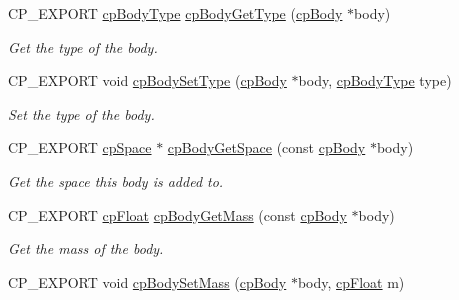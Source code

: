 \begin{DoxyCompactItemize}
C\+P\+\_\+\+E\+X\+P\+O\+RT \mbox{\hyperlink{group__cp_body_ga3581b128fd3e2734952aeac8545fd5ca}{cp\+Body\+Type}} \mbox{\hyperlink{group__cp_body_gab29fcc05a72380a8ae4cb09af6def230}{cp\+Body\+Get\+Type}} (\mbox{\hyperlink{structcp_body}{cp\+Body}} $\ast$body)
\begin{DoxyCompactList}\small\item\em Get the type of the body. \end{DoxyCompactList}\item 
\mbox{\label{group__cp_body_ga0ad914398f84d9096a7292f5e55e5771}} 
C\+P\+\_\+\+E\+X\+P\+O\+RT void \mbox{\hyperlink{group__cp_body_ga0ad914398f84d9096a7292f5e55e5771}{cp\+Body\+Set\+Type}} (\mbox{\hyperlink{structcp_body}{cp\+Body}} $\ast$body, \mbox{\hyperlink{group__cp_body_ga3581b128fd3e2734952aeac8545fd5ca}{cp\+Body\+Type}} type)
\begin{DoxyCompactList}\small\item\em Set the type of the body. \end{DoxyCompactList}\item 
\mbox{\label{group__cp_body_ga89651e80a253e8b53155bc9f13fa5718}} 
C\+P\+\_\+\+E\+X\+P\+O\+RT \mbox{\hyperlink{structcp_space}{cp\+Space}} $\ast$ \mbox{\hyperlink{group__cp_body_ga89651e80a253e8b53155bc9f13fa5718}{cp\+Body\+Get\+Space}} (const \mbox{\hyperlink{structcp_body}{cp\+Body}} $\ast$body)
\begin{DoxyCompactList}\small\item\em Get the space this body is added to. \end{DoxyCompactList}\item 
\mbox{\label{group__cp_body_ga1b9825773096740ac0a6b8c6320629bf}} 
C\+P\+\_\+\+E\+X\+P\+O\+RT \mbox{\hyperlink{group__basic_types_gac1ed65573e035bf892505768c852d8d3}{cp\+Float}} \mbox{\hyperlink{group__cp_body_ga1b9825773096740ac0a6b8c6320629bf}{cp\+Body\+Get\+Mass}} (const \mbox{\hyperlink{structcp_body}{cp\+Body}} $\ast$body)
\begin{DoxyCompactList}\small\item\em Get the mass of the body. \end{DoxyCompactList}\item 
\mbox{\label{group__cp_body_gac9177db2517a408213b37b8d071c9732}} 
C\+P\+\_\+\+E\+X\+P\+O\+RT void \mbox{\hyperlink{group__cp_body_gac9177db2517a408213b37b8d071c9732}{cp\+Body\+Set\+Mass}} (\mbox{\hyperlink{structcp_body}{cp\+Body}} $\ast$body, \mbox{\hyperlink{group__basic_types_gac1ed65573e035bf892505768c852d8d3}{cp\+Float}} m)

\end{DoxyCompactItemize}
